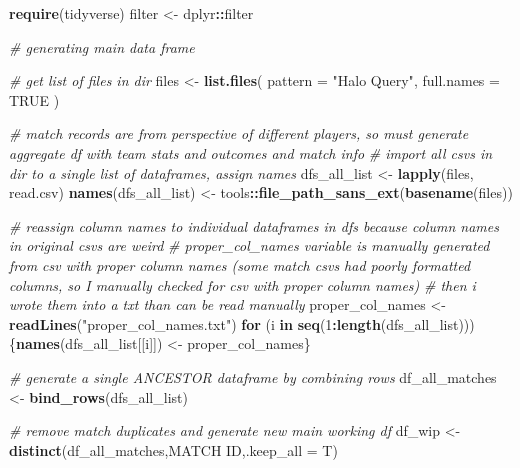 \documentclass[
]{article}
\newenvironment{Shaded}{\begin{snugshade}}{\end{snugshade}}
\newcommand{\AttributeTok}[1]{\textcolor[rgb]{0.13,0.29,0.53}{#1}}
\newcommand{\CommentTok}[1]{\textcolor[rgb]{0.56,0.35,0.01}{\textit{#1}}}
\newcommand{\ConstantTok}[1]{\textcolor[rgb]{0.56,0.35,0.01}{#1}}
\newcommand{\ControlFlowTok}[1]{\textcolor[rgb]{0.13,0.29,0.53}{\textbf{#1}}}
\newcommand{\DecValTok}[1]{\textcolor[rgb]{0.00,0.00,0.81}{#1}}
\newcommand{\FunctionTok}[1]{\textcolor[rgb]{0.13,0.29,0.53}{\textbf{#1}}}
\newcommand{\NormalTok}[1]{#1}
\newcommand{\OtherTok}[1]{\textcolor[rgb]{0.56,0.35,0.01}{#1}}
\newcommand{\SpecialCharTok}[1]{\textcolor[rgb]{0.81,0.36,0.00}{\textbf{#1}}}
\newcommand{\StringTok}[1]{\textcolor[rgb]{0.31,0.60,0.02}{#1}}
\begin{document}
\begin{Shaded}
\begin{Highlighting}[]
\FunctionTok{require}\NormalTok{(tidyverse)}
\NormalTok{filter }\OtherTok{\textless{}{-}}\NormalTok{ dplyr}\SpecialCharTok{::}\NormalTok{filter}

\CommentTok{\# generating main data frame}

\CommentTok{\# get list of files in dir}
\NormalTok{files }\OtherTok{\textless{}{-}} \FunctionTok{list.files}\NormalTok{(}
  \AttributeTok{pattern =} \StringTok{"Halo Query"}\NormalTok{,}
  \AttributeTok{full.names =} \ConstantTok{TRUE}
\NormalTok{  )}

\CommentTok{\# match records are from perspective of different players, so must generate aggregate df with team stats and outcomes and match info}
\CommentTok{\# import all csv\textquotesingle{}s in dir to a single list of dataframes, assign names}
\NormalTok{dfs\_all\_list }\OtherTok{\textless{}{-}} \FunctionTok{lapply}\NormalTok{(files, read.csv)}
\FunctionTok{names}\NormalTok{(dfs\_all\_list) }\OtherTok{\textless{}{-}}\NormalTok{ tools}\SpecialCharTok{::}\FunctionTok{file\_path\_sans\_ext}\NormalTok{(}\FunctionTok{basename}\NormalTok{(files))}

\CommentTok{\# reassign column names to individual dataframes in dfs because column names in original csv\textquotesingle{}s are weird}
\CommentTok{\# proper\_col\_names variable is manually generated from csv with proper column names (some match csv\textquotesingle{}s had poorly formatted columns, so I manually checked for csv with proper column names)}
\CommentTok{\# then i wrote them into a txt than can be read manually}
\NormalTok{proper\_col\_names }\OtherTok{\textless{}{-}} \FunctionTok{readLines}\NormalTok{(}\StringTok{"proper\_col\_names.txt"}\NormalTok{)}
\ControlFlowTok{for}\NormalTok{ (i }\ControlFlowTok{in} \FunctionTok{seq}\NormalTok{(}\DecValTok{1}\SpecialCharTok{:}\FunctionTok{length}\NormalTok{(dfs\_all\_list))) \{}\FunctionTok{names}\NormalTok{(dfs\_all\_list[[i]]) }\OtherTok{\textless{}{-}}\NormalTok{ proper\_col\_names\}}
     
\CommentTok{\# generate a single ANCESTOR dataframe by combining rows}
\NormalTok{df\_all\_matches }\OtherTok{\textless{}{-}} \FunctionTok{bind\_rows}\NormalTok{(dfs\_all\_list)}

\CommentTok{\# remove match duplicates and generate new main working df}
\NormalTok{df\_wip }\OtherTok{\textless{}{-}} \FunctionTok{distinct}\NormalTok{(df\_all\_matches,}\StringTok{\textasciigrave{}}\AttributeTok{MATCH ID}\StringTok{\textasciigrave{}}\NormalTok{,}\AttributeTok{.keep\_all =}\NormalTok{ T)}
\end{Highlighting}
\end{Shaded}
\end{document}

